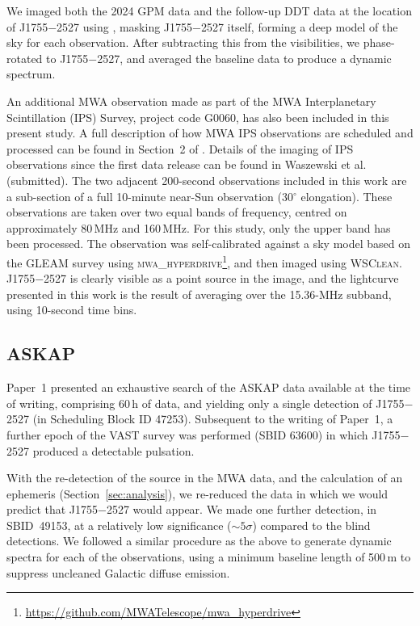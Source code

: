 \documentclass[fleqn,usenatbib]{mnras}
\newcommand{\src}{J1755$-$2527}
\newcommand{\Sect}{Section}
\begin{document}
We imaged both the 2024 GPM data and the follow-up DDT data at the location of \src{} using \citep[\textsc{WSClean}][]{2014MNRAS.444..606O}, masking \src{} itself, forming a deep model of the sky for each observation. After subtracting this from the visibilities, we phase-rotated to \src{}, and averaged the baseline data to produce a dynamic spectrum.


An additional MWA observation made as part of the MWA Interplanetary Scintillation (IPS) Survey, project code G0060, has also been included in this present study. 
A full description of how MWA IPS observations are scheduled and processed can be found in Section~2 of \citet{Morgan2022}.
Details of the imaging of IPS observations since the first data release can be found in Waszewski et al. (submitted).
The two adjacent 200-second observations included in this work are a sub-section of a full 10-minute near-Sun observation (30$^{\circ}$ elongation).
These observations are taken over two equal bands of frequency, centred on approximately 80\,MHz and 160\,MHz. For this study, only the upper band has been processed. 
The observation was self-calibrated against a sky model based on the GLEAM survey \citep{Hurley-Walker2017} using \textsc{mwa\_hyperdrive}\footnote{\url{https://github.com/MWATelescope/mwa_hyperdrive}}, and then imaged using \textsc{WSClean}.
\src{} is clearly visible as a point source in the image, and the lightcurve presented in this work is the result of averaging over the 15.36-MHz subband, using 10-second time bins.

\subsection{ASKAP} \label{sec:askap}

Paper~1 presented an exhaustive search of the ASKAP data available at the time of writing, comprising 60\,h of data, and yielding only a single detection of \src{} (in Scheduling Block ID 47253). Subsequent to the writing of Paper~1, a further epoch of the VAST survey was performed (SBID 63600) in which \src{} produced a detectable pulsation.

With the re-detection of the source in the MWA data, and the calculation of an ephemeris (\Sect~\ref{sec:analysis}), we re-reduced the data in which we would predict that \src{} would appear. We made one further detection, in SBID~49153, at a relatively low significance ($\sim5\sigma$) compared to the blind detections. We followed a similar procedure as the above to generate dynamic spectra for each of the observations, using a minimum baseline length of 500\,m to suppress uncleaned Galactic diffuse emission.
\end{document}
